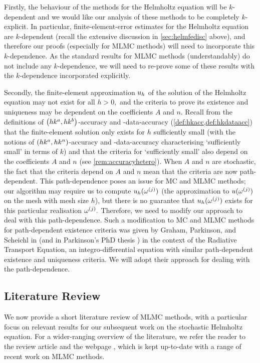 Firstly, the behaviour of the methods for the Helmholtz equation will be $k$-dependent and we would like our analysis of these methods to be completely $k$-explicit. In particular, finite-element-error estimates for the Helmholtz equation are $k$-dependent (recall the extensive discussion in \cref{sec:helmfedisc} above), and therefore our proofs (especially for MLMC methods) will need to incorporate this $k$-dependence. As the standard results for MLMC methods (understandably) do not include any $k$-dependence, we will need to re-prove some of these results with the $k$-dependence incorporated explicitly.

Secondly, the finite-element approximation $u_{h}$ of the solution of the Helmholtz equation may not exist for all $h > 0,$ and the criteria to prove its existence and uniqueness may be dependent on the coefficients $A$ and $n.$ Recall from the definitions of $\hk{a}{b}$-accuracy and -data-accuracy (\cref{def:hkacc,def:hkdataacc}) that the finite-element solution only exists for $h$ sufficiently small (with the notions of $\hk{a}{n}$-accuracy and -data-accuracy characterising `sufficiently small' in terms of $k$) and that the criteria for `sufficiently small' also depend on the coefficients $A$ and $n$ (see \cref{rem:accuracyhetero}). When $A$ and $n$ are stochastic, the fact that the criteria depend on $A$ and $n$ mean that the criteria are now path-dependent. This path-dependence poses an issue for MC and MLMC methods; our algorithm may require us to compute $u_{h}(\omega^{(j)})$ (the approximation to $u(\omega^{(j)})$ on the mesh with mesh size $h$), but there is no guarantee that $u_{h}(\omega^{(j)})$ exists for this particular realisation $\omega^{(j)}.$ Therefore, we need to modify our approach to deal with this path-dependence. Such a modification to MC and MLMC methods for path-dependent existence criteria was given by Graham, Parkinson, and Scheichl in \cite{GrPaSc:19} (and in Parkinson's PhD thesis \cite{Pa:18}) in the context of the Radiative Transport Equation, an integro-differential equation with similar path-dependent existence and uniqueness criteria. We will adopt their approach for dealing with the path-dependence.

\subsection{Literature Review}
We now provide a short literature review of MLMC methods, with a particular focus on relevant results for our subsequent work on the stochastic Helmholtz equation. For a wider-ranging overview of the literature, we refer the reader to the review article \cite{Gi:15} and the webpage \cite{Gi}, which is kept up-to-date with a range of recent work on MLMC methods.

